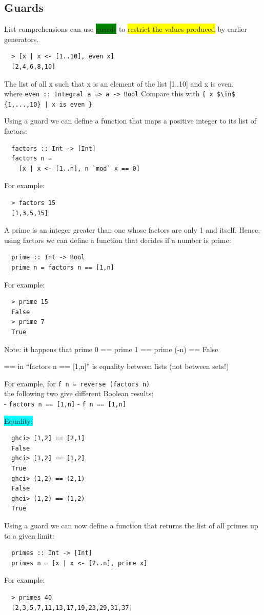 \documentclass[tikz,border=10pt]{project_plan}
\begin{document}
\subsection{Guards}
List comprehensions can use \colorbox{green}{guards} to \colorbox{yellow}{restrict the
  values produced} by earlier generators.
\begin{lstlisting}
  > [x | x <- [1..10], even x]
  [2,4,6,8,10]
\end{lstlisting}
The list of all x such that x is an element of the list [1..10] and x is even.\\
where \lstinline{even :: Integral a => a -> Bool}
Compare this with \lstinline[mathescape]?{ x $\in$ {1,...,10} | x is even }?

Using a guard we can define a function that maps a positive integer to its list of factors:
\begin{lstlisting}
  factors :: Int -> [Int]
  factors n =
    [x | x <- [1..n], n `mod` x == 0]
\end{lstlisting}
For example:
\begin{lstlisting}
  > factors 15
  [1,3,5,15]
\end{lstlisting}

A prime is an integer greater than one whose factors are
only 1 and itself. Hence, using factors we can define a
function that decides if a number is prime:
\begin{lstlisting}
  prime :: Int -> Bool
  prime n = factors n == [1,n]
\end{lstlisting}
For example:
\begin{lstlisting}
  > prime 15
  False
  > prime 7
  True
\end{lstlisting}
Note: it happens that prime 0 == prime 1 == prime (-n) == False

== in “factors n == [1,n]” is equality between lists (not
between sets!)

For example, for \lstinline|f n = reverse (factors n)|\\
the following two give different Boolean results:\\
- \lstinline|factors n == [1,n]|
- \lstinline|f n == [1,n]|

\colorbox{cyan}{Equality;}
\begin{lstlisting}
  ghci> [1,2] == [2,1]
  False
  ghci> [1,2] == [1,2]
  True
  ghci> (1,2) == (2,1)
  False
  ghci> (1,2) == (1,2)
  True
\end{lstlisting}

Using a guard we can now define a function that returns
the list of all primes up to a given limit:
\begin{lstlisting}
  primes :: Int -> [Int]
  primes n = [x | x <- [2..n], prime x]
\end{lstlisting}
For example:
\begin{lstlisting}
  > primes 40
  [2,3,5,7,11,13,17,19,23,29,31,37]
\end{lstlisting}
\end{document}
